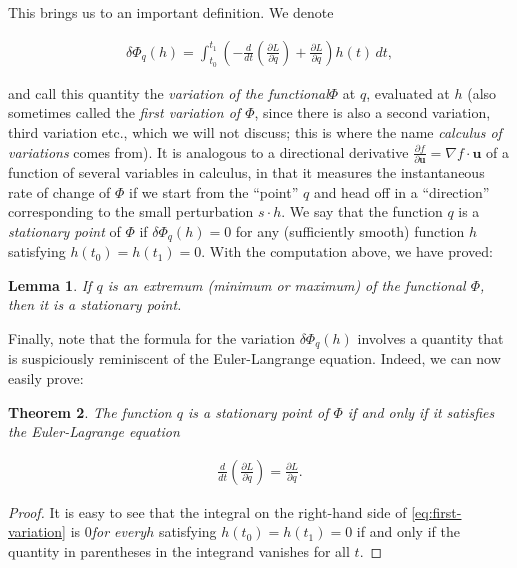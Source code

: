\documentclass[11pt]{report}
\theoremstyle{plain}
\newtheorem{thm}{Theorem}[chapter]
\newtheorem{lem}[thm]{Lemma}
\theoremstyle{definition}
\begin{document}
\noindent This brings us to an important definition. We denote

\begin{equation*} \tag{15}\label{eq:first-variation}
\begin{split}
\delta\Phi_q(h) = \int_{t_0}^{t_1} \left(-\frac{d}{dt}\left(\frac{\partial L}{\partial \dot{q}}\right) + \frac{\partial L}{\partial q} \right)h(t)\,dt,
\end{split}
\end{equation*}

\noindent and call this quantity the \emph{variation of the
functional}$\Phi$ at $q$, evaluated at $h$ (also
sometimes called the \emph{first variation of $\Phi$},
since there is also a second variation, third
variation etc., which we will not discuss; this is
where the name \emph{calculus of variations} comes from).
It is analogous to a directional derivative
$\frac{\partial f}{\partial \mathbf{u}} = \nabla f
\cdot \mathbf{u}$
of a function of several variables in calculus, in
that it measures the instantaneous rate of change of
$\Phi$ if we start from the ``point'' $q$ and head off
in a ``direction'' corresponding to the small
perturbation $s\cdot h$. We say that the function $q$
is a \emph{stationary point} of $\Phi$ if
$\delta\Phi_q(h) = 0$ for any (sufficiently smooth)
function $h$ satisfying $h(t_0)=h(t_1)=0$. With the
computation above, we have proved:

\begin{lem}
If $q$ is an extremum (minimum or maximum) of the
functional $\Phi$, then it is a stationary point.
\end{lem}

\noindent Finally, note that the formula for the variation
$\delta \Phi_q(h)$ involves a quantity that is
suspiciously reminiscent of the Euler-Langrange
equation. Indeed, we can now easily prove:

\begin{thm}
The function $q$ is a stationary point of $\Phi$ if
and only if it satisfies the Euler-Lagrange equation

\begin{align*}
\frac{d}{dt}\left( \frac{\partial L}{\partial \dot{q}} \right) = \frac{\partial L}{\partial q}.
\end{align*}

\end{thm}

\begin{proof}
It is easy to see that the integral on the right-hand
side of \eqref{eq:first-variation} is $0$\emph{for every}$h$
satisfying $h(t_0)=h(t_1)=0$ if and only if the
quantity in parentheses in the integrand vanishes for
all $t$.
\end{proof}
\end{document}
